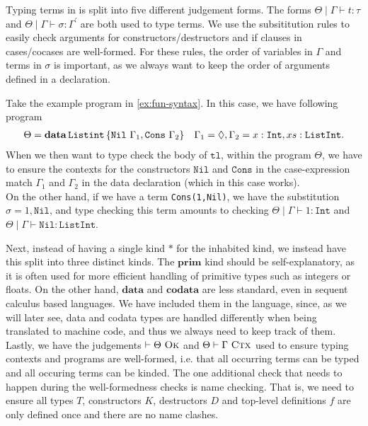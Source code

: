 Typing terms in \surfacelang{} is split into five different judgement forms.
The forms $\Theta\mid\Gamma\vdash t:\tau$ and $\Theta\mid\Gamma\vdash\sigma:\Gamma^{\prime}$ are both used to type terms.
We use the subsititution rules to easily check arguments for constructors/destructors and if clauses in cases/cocases are well-formed.
For these rules, the order of variables in $\Gamma$ and terms in $\sigma$ is important, as we always want to keep the order of arguments defined in a declaration.
\begin{example}
  Take the example program in \cref{ex:fun-syntax}.
  In this case, we have following program
  \begin{align*}
    \Theta= \mathbf{data}\, \mathtt{Listint}\, \{ \mathtt{Nil}\ \Gamma_1, \mathtt{Cons}\ \Gamma_2 \} \quad
    \Gamma_1=\Diamond, \Gamma_2 = x:\mathtt{Int}, xs:\mathtt{ListInt}.
  \end{align*}
  When we then want to type check the body of $\mathtt{tl}$, within the program $\Theta$,
  we have to ensure the contexts for the constructors $\mathtt{Nil}$ and $\mathtt{Cons}$ in the case-expression match $\Gamma_1$ and $\Gamma_2$ in the data declaration (which in this case works).\\
  On the other hand, if we have a term \lstinline{Cons(1,Nil)}, we have the substitution $\sigma = 1,\mathtt{Nil}$, and type checking this term amounts to checking
  $\Theta\mid\Gamma \vdash 1:\mathtt{Int}$ and $\Theta\mid\Gamma\vdash \mathtt{Nil}:\mathtt{ListInt}$.
\end{example}
Next, instead of having a single kind $*$ for the inhabited kind, we instead have this split into three distinct kinds.
The $\mathbf{prim}$ kind should be self-explanatory, as it is often used for more efficient handling of primitive types such as integers or floats.
On the other hand, $\mathbf{data}$ and $\mathbf{codata}$ are less standard, even in sequent calculus based languages.
We have included them in the language, since, as we will later see, data and codata types are handled differently when being translated to machine code, and thus we always need to keep track of them.\\
Lastly, we have the judgements $\vdash \Theta\ \textsc{Ok}$ and $\Theta\vdash\Gamma\ \textsc{Ctx}$ used to ensure typing contexts and programs are well-formed,
i.e. that all occurring terms can be typed and all occuring terms can be kinded.
The one additional check that needs to happen during the well-formedness checks is name checking.
That is, we need to ensure all types $T$, constructors $K$, destructors $D$ and top-level definitions $f$ are only defined once and there are no name clashes.
